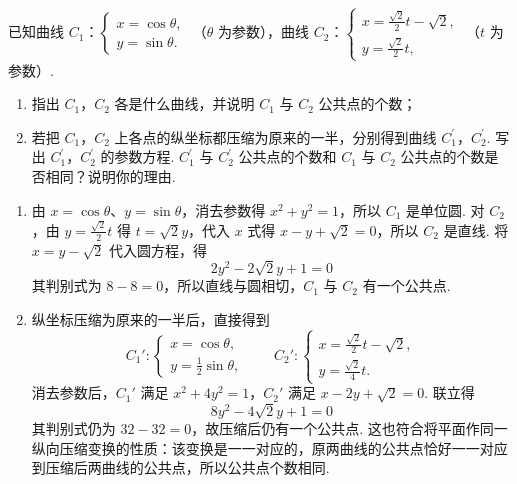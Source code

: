 \begin{problem}
已知曲线 \(C_{1}\)：\(\begin{cases}
x = \cos \theta,\\
y = \sin \theta.
\end{cases}\) （\(\theta\) 为参数），曲线 \(C_{2}\)：\(\begin{cases}
x = \frac{\sqrt{2}}{2} t - \sqrt{2},\\
y = \frac{\sqrt{2}}{2} t,
\end{cases}\) （\(t\) 为参数）.

\begin{enumerate}
\item 指出 \(C_{1}\)，\(C_{2}\) 各是什么曲线，并说明 \(C_{1}\) 与 \(C_{2}\) 公共点的个数；
\item 若把 \(C_{1}\)，\(C_{2}\) 上各点的纵坐标都压缩为原来的一半，分别得到曲线 \(C_{1}^{\prime}\)，\(C_{2}^{\prime}\). 写出 \(C_{1}^{\prime}\)，\(C_{2}^{\prime}\) 的参数方程. \(C_{1}^{\prime}\) 与 \(C_{2}^{\prime}\) 公共点的个数和 \(C_{1}\) 与 \(C_{2}\) 公共点的个数是否相同？说明你的理由.
\end{enumerate}

\begin{solution}
\begin{enumerate}
\item 由 \(x=\cos\theta\)、\(y=\sin\theta\)，消去参数得 \(x^2+y^2=1\)，所以 \(C_1\) 是单位圆. 对 \(C_2\)，由 \(y=\frac{\sqrt2}{2}t\) 得 \(t=\sqrt2y\)，代入 \(x\) 式得 \(x-y+\sqrt2=0\)，所以 \(C_2\) 是直线. 将 \(x=y-\sqrt2\) 代入圆方程，得
\[
2y^2-2\sqrt2y+1=0
\]
其判别式为 \(8-8=0\)，所以直线与圆相切，\(C_1\) 与 \(C_2\) 有一个公共点.
\item 纵坐标压缩为原来的一半后，直接得到
\[
C_1':\begin{cases}
x=\cos\theta,\\
y=\frac12\sin\theta,
\end{cases}
\qquad
C_2':\begin{cases}
x=\frac{\sqrt2}{2}t-\sqrt2,\\
y=\frac{\sqrt2}{4}t.
\end{cases}
\]
消去参数后，\(C_1'\) 满足 \(x^2+4y^2=1\)，\(C_2'\) 满足 \(x-2y+\sqrt2=0\). 联立得
\[
8y^2-4\sqrt2y+1=0
\]
其判别式仍为 \(32-32=0\)，故压缩后仍有一个公共点. 这也符合将平面作同一纵向压缩变换的性质：该变换是一一对应的，原两曲线的公共点恰好一一对应到压缩后两曲线的公共点，所以公共点个数相同.
\end{enumerate}
\end{solution}
\end{problem}


